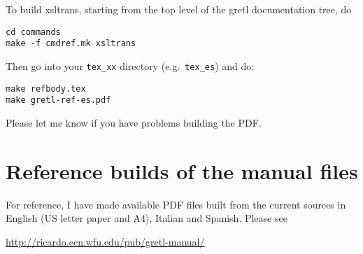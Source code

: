 \documentclass{article}
\begin{document}
To build \textsf{xsltrans}, starting from the top level of the
\textsf{gretl} documentation tree, do

\begin{verbatim}
cd commands
make -f cmdref.mk xsltrans
\end{verbatim}

Then go into your \texttt{tex\_xx} directory (e.g.\ \texttt{tex\_es})
and do:

\begin{verbatim}
make refbody.tex
make gretl-ref-es.pdf
\end{verbatim}

Please let me know if you have problems building the PDF.

\section{Reference builds of the manual files}

For reference, I have made available PDF files built from the current
sources in English (US letter paper and A4), Italian and Spanish.
Please see

\begin{center}
\url{http://ricardo.ecn.wfu.edu/pub/gretl-manual/} 
\end{center}
\end{document}
